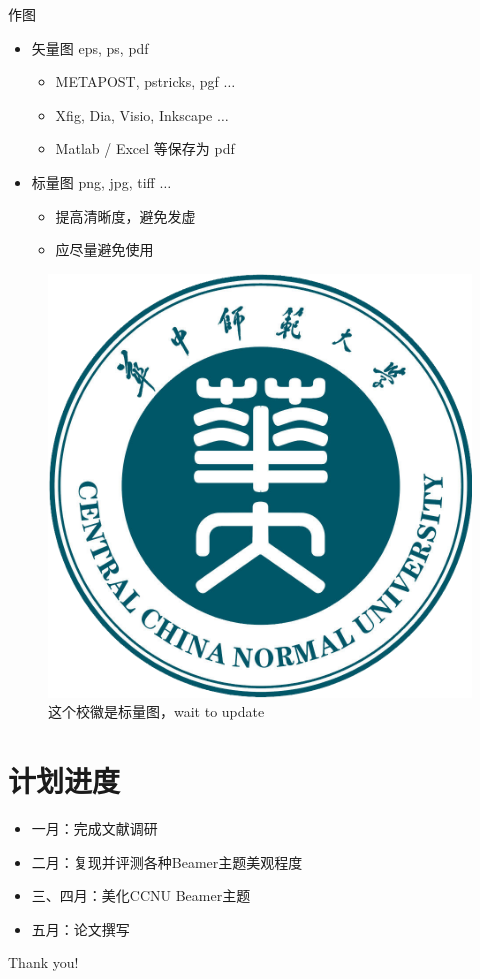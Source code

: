 \documentclass[aspectratio=169]{beamer}
\begin{document}
\begin{frame}{作图}
	\begin{itemize}
		\item 矢量图 eps, ps, pdf
		      \begin{itemize}
			      \item METAPOST, pstricks, pgf $\ldots$
			      \item Xfig, Dia, Visio, Inkscape $\ldots$
			      \item Matlab / Excel 等保存为 pdf
		      \end{itemize}
		\item 标量图 png, jpg, tiff $\ldots$
		      \begin{itemize}
			      \item 提高清晰度，避免发虚
			      \item 应尽量避免使用
		      \end{itemize}
	\end{itemize}
	\begin{figure}[htpb]
		\centering
		\includegraphics[width=0.2\linewidth]{pic/CCNU.jpg}
		\caption{这个校徽是标量图，wait to update}
	\end{figure}
\end{frame}

\section{计划进度}
\begin{frame}
	\begin{itemize}
		\item 一月：完成文献调研
		\item 二月：复现并评测各种Beamer主题美观程度
		\item 三、四月：美化CCNU Beamer主题
		\item 五月：论文撰写
	\end{itemize}
\end{frame}


%     
%     


\begin{frame}
	\begin{center}
		{\Huge Thank you!}
	\end{center}
\end{frame}
\end{document}
